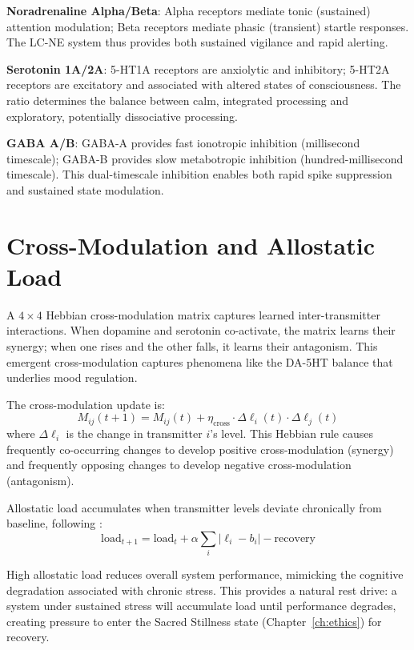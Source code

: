 \documentclass[12pt]{book}
\begin{document}
\textbf{Noradrenaline Alpha/Beta}: Alpha receptors mediate tonic (sustained) attention modulation; Beta receptors mediate phasic (transient) startle responses. The LC-NE system thus provides both sustained vigilance and rapid alerting.

\textbf{Serotonin 1A/2A}: 5-HT1A receptors are anxiolytic and inhibitory; 5-HT2A receptors are excitatory and associated with altered states of consciousness. The ratio determines the balance between calm, integrated processing and exploratory, potentially dissociative processing.

\textbf{GABA A/B}: GABA-A provides fast ionotropic inhibition (millisecond timescale); GABA-B provides slow metabotropic inhibition (hundred-millisecond timescale). This dual-timescale inhibition enables both rapid spike suppression and sustained state modulation.

\section{Cross-Modulation and Allostatic Load}

A $4 \times 4$ Hebbian cross-modulation matrix captures learned inter-transmitter interactions. When dopamine and serotonin co-activate, the matrix learns their synergy; when one rises and the other falls, it learns their antagonism. This emergent cross-modulation captures phenomena like the DA-5HT balance that underlies mood regulation.

The cross-modulation update is:
\begin{equation}
M_{ij}(t+1) = M_{ij}(t) + \eta_{\text{cross}} \cdot \Delta\ell_i(t) \cdot \Delta\ell_j(t)
\end{equation}
where $\Delta\ell_i$ is the change in transmitter $i$'s level. This Hebbian rule causes frequently co-occurring changes to develop positive cross-modulation (synergy) and frequently opposing changes to develop negative cross-modulation (antagonism).

Allostatic load accumulates when transmitter levels deviate chronically from baseline, following \citet{mcewen1998}:
\begin{equation}\label{eq:allostatic}
\text{load}_{t+1} = \text{load}_t + \alpha \sum_i |\ell_i - b_i| - \text{recovery}
\end{equation}

High allostatic load reduces overall system performance, mimicking the cognitive degradation associated with chronic stress. This provides a natural rest drive: a system under sustained stress will accumulate load until performance degrades, creating pressure to enter the Sacred Stillness state (Chapter~\ref{ch:ethics}) for recovery.
\end{document}
